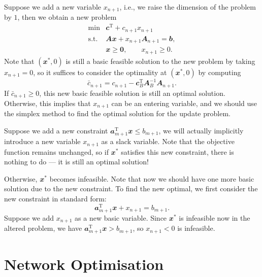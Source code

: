 \documentclass[math, code]{amznotes}
\theoremstyle{remark}
\begin{document}
Suppose we add a new variable $x_{n + 1}$, i.e., we raise the dimension of the problem by $1$, then we obtain a new problem 
\begin{align*}
    \min & \mathbfit{c}^{\mathrm{T}} + c_{n + 1}x_{n + 1} \\
    \textrm{s.t. } & \mathbfit{Ax} + x_{n + 1}\mathbfit{A}_{n + 1} = \mathbfit{b}, \\
    & \mathbfit{x} \geq \mathbf{0}, \qquad x_{n + 1} \geq 0.
\end{align*}
Note that $\left(\mathbfit{x}^*, 0\right)$ is still a basic feasible solution to the new problem by taking $x_{n + 1} = 0$, so it suffices to consider the optimality at $\left(\mathbfit{x}^*, 0\right)$ by computing 
\begin{equation*}
    \bar{c}_{n + 1} = c_{n + 1} - \mathbfit{c}_B^{\mathrm{T}}\mathbfit{A}_B^{-1}\mathbfit{A}_{n + 1}.
\end{equation*}
If $\bar{c}_{n + 1} \geq 0$, this new basic feasible solution is still an optimal solution. Otherwise, this implies that $x_{n + 1}$ can be an entering variable, and we should use the simplex method to find the optimal solution for the update problem.

Suppose we add a new constraint $\mathbfit{a}_{m + 1}^{\mathrm{T}}\mathbfit{x} \leq b_{m + 1}$, we will actually implicitly introduce a new variable $x_{n + 1}$ as a slack variable. Note that the objective function remains unchanged, so if $\mathbfit{x}^*$ satisfies this new constraint, there is nothing to do --- it is still an optimal solution!

Otherwise, $\mathbfit{x}^*$ becomes infeasible. Note that now we should have one more basic solution due to the new constraint. To find the new optimal, we first consider the new constraint in standard form:
\begin{equation*}
    \mathbfit{a}_{m + 1}^{\mathrm{T}}\mathbfit{x} + x_{n + 1} = b_{m + 1}.
\end{equation*}
Suppose we add $x_{n + 1}$ as a new basic variable. Since $\mathbfit{x}^*$ is infeasible now in the altered problem, we have $\mathbfit{a}_{m + 1}^{\mathrm{T}}\mathbfit{x} > b_{m + 1}$, so $x_{n + 1} < 0$ is infeasible.

\chapter{Network Optimisation}
\end{document}
